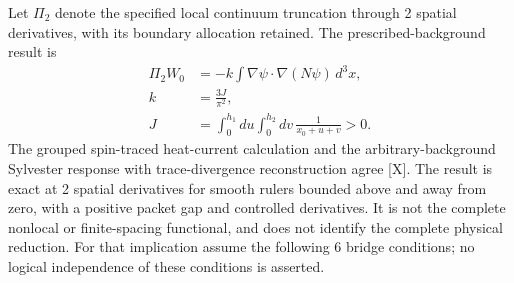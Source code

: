 Let $\Pi_2$ denote the specified local continuum truncation through
2 spatial derivatives, with its boundary allocation retained.
The prescribed-background result is
\begin{equation}\label{eq:bridgeconditions-polar-leading}
 \begin{aligned}
 \Pi_2 W_0&=-k\int\nabla\psi\cdot\nabla(N\psi)\,d^3x,\\
 k&=\frac{3J}{\pi^2},\\
 J&=\int_0^{h_1}\!du\int_0^{h_2}\!dv\,
                         \frac1{x_0+u+v}>0.
 \end{aligned}
\end{equation}
The grouped spin-traced heat-current calculation and the
arbitrary-background Sylvester response with trace-divergence
reconstruction agree [X].  The result is exact at 2 spatial
derivatives for smooth rulers bounded above and away from zero,
with a positive packet gap and controlled derivatives.  It is not
the complete nonlocal or finite-spacing functional, and does not
identify the complete physical reduction.
For that implication assume the following 6 bridge conditions; no
logical independence of these conditions is asserted.

